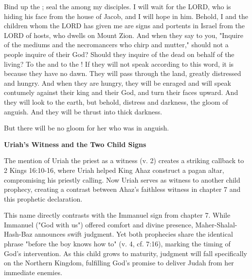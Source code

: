 \documentclass[11pt]{article}
\begin{document}
\begin{biblicaloutline}[Isaiah 8:16-9:1a]

    \begin{versesection}{2em}
         Bind up the ; seal the  among my disciples.  I will wait for the LORD, who is hiding his face from the house of Jacob, and I will hope in him.  Behold, I and the children whom the LORD has given me are signs and portents in Israel from the LORD of hosts, who dwells on Mount Zion.  And when they say to you, "Inquire of the mediums and the necromancers who chirp and mutter," should not a people inquire of their God? Should they inquire of the dead on behalf of the living?  To the  and to the ! If they will not speak according to this word, it is because they have no dawn.  They will pass through the land, greatly distressed and hungry. And when they are hungry, they will be enraged and will speak contumely against their king and their God, and turn their faces upward.  And they will look to the earth, but behold, distress and darkness, the gloom of anguish. And they will be thrust into thick darkness.
        
         But there will be no gloom for her who was in anguish.
    \end{versesection}

\end{biblicaloutline}

\newpage
{\large\bfseries Uriah's Witness and the Two Child Signs}
\vspace{1em}

The mention of Uriah the priest as a witness (v. 2) creates a striking callback to 2 Kings 16:10-16, where Uriah helped King Ahaz construct a pagan altar, compromising his priestly calling. Now Uriah serves as witness to another child prophecy, creating a contrast between Ahaz's faithless witness in chapter 7 and this prophetic declaration.

\vspace{1em}

\vspace{1em}
This name directly contrasts with the Immanuel sign from chapter 7. While Immanuel ("God with us") offered comfort and divine presence, Maher-Shalal-Hash-Baz announces swift judgment. Yet both prophecies share the identical phrase "before the boy knows how to" (v. 4, cf. 7:16), marking the timing of God's intervention. As this child grows to maturity, judgment will fall specifically on the Northern Kingdom, fulfilling God's promise to deliver Judah from her immediate enemies.
\end{document}
